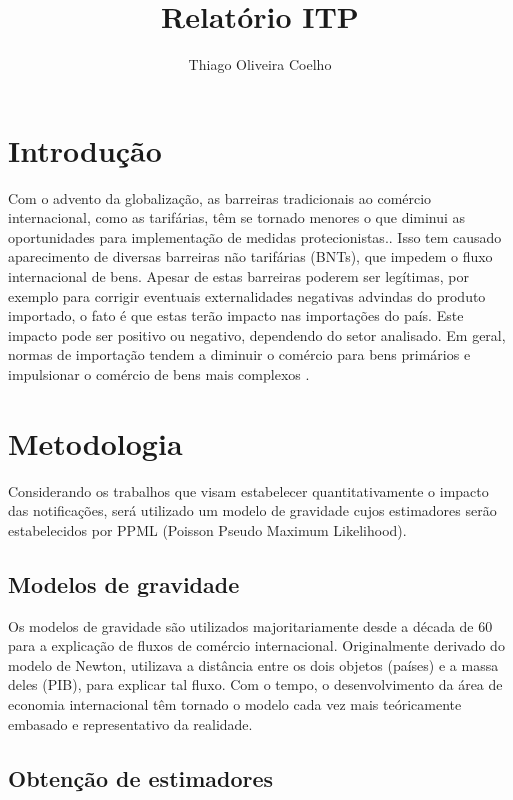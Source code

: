 \documentclass[12pt, a4paper]{article}
\title{Relatório ITP}
\author{Thiago Oliveira Coelho}
\begin{document}
\maketitle

\tableofcontents

\clearpage

\section{Introdução}

Com o advento da globalização, as barreiras tradicionais ao comércio internacional, como as tarifárias, têm se tornado menores o que diminui as oportunidades para implementação de medidas protecionistas.\cite{maskus2000quantifying}. Isso tem causado aparecimento de diversas barreiras não tarifárias (BNTs), que impedem o fluxo internacional de bens.
Apesar de estas barreiras poderem ser legítimas, por exemplo para corrigir eventuais externalidades negativas advindas do produto importado,  o fato é que estas terão impacto nas importações do país. Este impacto pode ser positivo ou negativo, dependendo do setor analisado. Em geral, normas de importação tendem a diminuir o comércio para bens primários e impulsionar o comércio de bens mais complexos \cite{moenius}.

\section{Metodologia}

Considerando os trabalhos que visam estabelecer quantitativamente o impacto das notificações, será utilizado um modelo de gravidade cujos estimadores serão estabelecidos por PPML (Poisson Pseudo Maximum Likelihood). 

\subsection{Modelos de gravidade}

Os modelos de gravidade são utilizados majoritariamente desde a década de 60 para a explicação de fluxos de comércio internacional. Originalmente derivado do modelo de Newton, utilizava a distância entre os dois objetos (países) e a massa deles (PIB), para explicar tal fluxo. Com o tempo, o desenvolvimento da área de economia internacional têm tornado o modelo cada vez mais teóricamente embasado e representativo da realidade. 

\subsection{Obtenção de estimadores}
\end{document}

